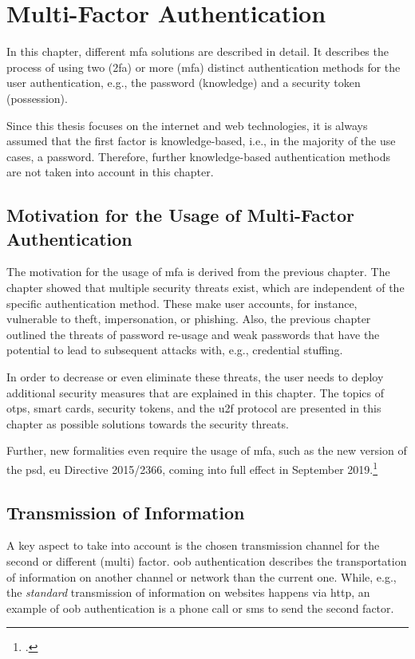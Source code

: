 \chapter{Multi-Factor Authentication}
\label{chap:mfa}

In this chapter, different \gls{mfa} solutions are described in detail. It describes the process of using two (\gls{2fa}) or more (\gls{mfa}) distinct authentication methods for the user authentication, e.g., the password (knowledge) and a security token (possession).

Since this thesis focuses on the internet and web technologies, it is always assumed that the first factor is knowledge-based, i.e., in the majority of the use cases, a password. Therefore, further knowledge-based authentication methods are not taken into account in this chapter.

\section{Motivation for the Usage of Multi-Factor Authentication}

The motivation for the usage of \gls{mfa} is derived from the previous chapter. The chapter showed that multiple security threats exist, which are independent of the specific authentication method. These make user accounts, for instance, vulnerable to theft, impersonation, or phishing. Also, the previous chapter outlined the threats of password re-usage and weak passwords that have the potential to lead to subsequent attacks with, e.g., credential stuffing.

 In order to decrease or even eliminate these threats, the user needs to deploy additional security measures that are explained in this chapter. The topics of \glspl{otp}, smart cards, security tokens, and the \gls{u2f} protocol are presented in this chapter as possible solutions towards the security threats.
 
 Further, new formalities even require the usage of \gls{mfa}, such as the new version of the \gls{psd}, \gls{eu} Directive 2015/2366, coming into full effect in September 2019.\footcites[See][10]{NOCTOR20189}

\newpage

\section{Transmission of Information}

A key aspect to take into account is the chosen transmission channel for the second or different (multi) factor. \gls{oob} authentication describes the transportation of information on another channel or network than the current one. While, e.g., the \textit{standard} transmission of information on websites happens via \gls{http}, an example of \gls{oob} authentication is a phone call or \gls{sms} to send the second factor.

